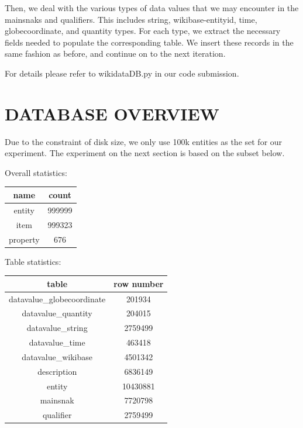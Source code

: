 \documentclass[12pt]{article}
\begin{document}
Then, we deal with the various types of data values that we may encounter in the mainsnaks and qualifiers. This includes string, wikibase-entityid, time, globecoordinate, and quantity types. For each type, we extract the necessary fields needed to populate the corresponding table. We insert these records in the same fashion as before, and continue on to the next iteration.

For details please refer to wikidataDB.py in our code submission.
\section{DATABASE OVERVIEW}

Due to the constraint of disk size, we only use 100k entities as the set for our experiment. The experiment on the next section is based on the subset below.

Overall statistics:
\begin{center}
  \begin{tabular}{ | c | c |}
    \hline
    name & count \\ \hline\hline
    entity & 999999 \\ \hline
    item & 999323 \\ \hline
    property & 676 \\
    \hline
  \end{tabular}
\end{center}

Table statistics:
\begin{center}
  \begin{tabular}{ | c | c |}
    \hline
    table & row number \\ \hline\hline
    datavalue\_globecoordinate & 201934 \\ \hline
    datavalue\_quantity & 204015 \\ \hline
    datavalue\_string & 2759499 \\ \hline
    datavalue\_time & 463418 \\ \hline
    datavalue\_wikibase & 4501342 \\ \hline
    description & 6836149 \\ \hline
    entity & 10430881 \\ \hline
    mainsnak & 7720798 \\ \hline
    qualifier & 2759499 \\
    \hline
  \end{tabular}
\end{center}
\end{document}

